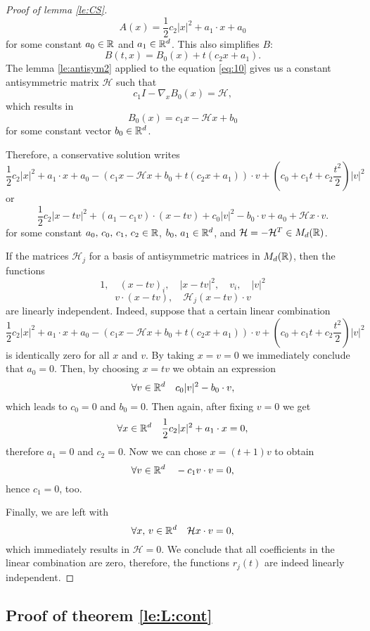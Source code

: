 \begin{subappendices}
\begin{proof}[Proof of lemma \ref{le:CS}]
\begin{equation}
	A(x)=\frac{1}{2}c_2|x|^2+a_1\cdot x + a_0 
	\label{eq:12}
\end{equation}for some constant $a_0\in {\mathbb R}$ and $a_1\in {\mathbb R^d}$.
This also simplifies $B$:
\[B(t,x)=B_0(x)+t(c_2x+a_1).\]
The lemma \ref{le:antisym2} applied to the equation \eqref{eq:10} gives us a constant antisymmetric matrix $\mathcal H$ such that \[c_1I-\nabla_x B_0(x)=\mathcal H,\]which results in \begin{equation}
	B_0(x)=c_1x-\mathcal H x+b_0 
	\label{eq:13}
\end{equation}for some constant vector $b_0\in {\mathbb R^d}$.

Therefore, a conservative solution writes
\[\frac{1}{2}c_2|x|^2+a_1\cdot x + a_0-\left(c_1x-\mathcal H x+b_0 +t(c_2x+a_1)\right)\cdot v+\left(c_0+c_1t+c_2\frac{t^2}{2}\right)|v|^2
\]
or
\[\frac{1}{2}c_2|x-tv|^2+(a_1-c_1v)\cdot(x-tv)+c_0|v|^2-b_0\cdot v+a_0+\mathcal Hx\cdot v.\]
for some constant $a_0,\,c_0,\,c_1
,\,c_2\in{\mathbb R}$, $b_0,\,a_1\in{\mathbb R^d}$, and $\mathcal H=-\mathcal H^T\in M_d({\mathbb R})$.


If the matrices $\mathcal H_{j}$ for a basis of antisymmetric matrices in $M_d({\mathbb R})$, then the functions
\[1, \quad (x-tv)_i,\quad |x-tv|^2, \quad v_i,\quad |v|^2\]
\[v\cdot (x-tv),\quad \mathcal H_{j}(x-tv)\cdot v\]
are linearly independent.
Indeed, suppose that a certain linear combination 
\[\frac{1}{2}c_2|x|^2+a_1\cdot x + a_0-\left(c_1x-\mathcal H x+b_0 +t(c_2x+a_1)\right)\cdot v+\left(c_0+c_1t+c_2\frac{t^2}{2}\right)|v|^2\]
is identically zero for all $x$ and $v$. By taking $x=v=0$ we immediately conclude that $a_0=0$. Then, by choosing $x=tv$ we obtain an expression \[\forall v\in{\mathbb R^d} \quad c_0|v|^2-b_0\cdot v,\]which leads to $c_0=0$ and $b_0=0$.
Then again, after fixing $v=0$ we get 
\[\forall x\in{\mathbb R^d} \quad \frac{1}{2}c_2|x |^2+ a_1 \cdot x =0 ,\]
therefore $a_1=0$ and $c_2=0$. Now we can chose $x=(t+1)v$ to obtain
\[\forall v \in{\mathbb R^d} \quad     -c_1v \cdot v=0,\]
hence $c_1=0$, too.

Finally, we are left with \[\forall x,\,v\in{\mathbb R^d}\quad \mathcal Hx\cdot v=0,\]
which immediately results in $\mathcal H=0$. We conclude that all coefficients in the linear combination are zero, therefore, the functions $r_j(t)$ are indeed linearly independent.
\end{proof}


\subsection{Proof of theorem \ref{le:L:cont}} %
\label{sec:proof_of_lemma_Lcont}




\end{subappendices}

